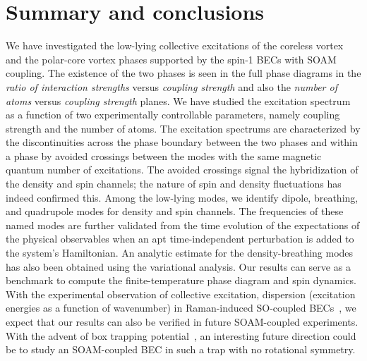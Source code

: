 \documentclass[pra,twocolumn,aps,superscriptaddress,showpacs,longbibliography]{revtex4-1}
\begin{document}
\section{Summary and conclusions}
\label{concl}
We have investigated the low-lying collective excitations of the coreless vortex and the polar-core vortex phases supported
by the spin-1 BECs with SOAM coupling. The existence of the two phases is seen in the full phase diagrams in the {\em ratio of interaction strengths} versus 
{\em coupling strength} and also the {\em number of atoms} versus {\em coupling strength} planes. We have studied the excitation spectrum as a function of
two experimentally controllable parameters, namely coupling 
strength and the number of atoms. The excitation spectrums are characterized
by the discontinuities across the phase boundary between the two phases and within a phase by avoided crossings between the modes with the same magnetic
quantum number of excitations. The avoided crossings signal the hybridization of the density and spin channels; the nature of spin and density fluctuations 
has indeed confirmed this. Among the low-lying modes, we identify dipole, breathing, and quadrupole modes for density and spin channels.
The frequencies of these named modes are further validated from the time evolution of the expectations of the physical observables when
an apt time-independent perturbation is added to the system's Hamiltonian. An analytic estimate for the density-breathing modes
has also been obtained using the variational analysis. Our results can serve as a benchmark to compute the finite-temperature phase diagram and spin dynamics.
With the experimental observation of collective excitation, dispersion (excitation energies as a function of wavenumber) in Raman-induced
SO-coupled BECs~\cite{PhysRevA.90.063624, PhysRevLett.114.105301}, we expect that our results can also be verified in future SOAM-coupled experiments.
With the advent of box trapping potential~\cite{PhysRevLett.110.200406}, an interesting future direction could be to study an SOAM-coupled BEC in 
such a trap with no rotational symmetry.  
\end{document}
